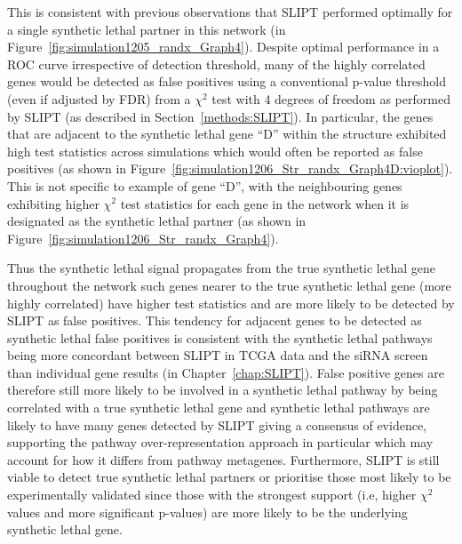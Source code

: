 This is consistent with previous observations that \gls{SLIPT} performed optimally for a single \gls{synthetic lethal} partner in this network (in Figure~\ref{fig:simulation1205_randx_Graph4}). Despite optimal performance in a \gls{ROC} curve irrespective of detection threshold, many of the highly correlated genes would be detected as false positives using a conventional p-value threshold (even if adjusted by \gls{FDR}) from a $\chi^2$ test with 4 degrees of freedom as performed by \gls{SLIPT} (as described in Section~\ref{methods:SLIPT}). In particular, the genes that are adjacent to the \gls{synthetic lethal} gene ``D'' within the  structure exhibited high test statistics across simulations which would often be reported as false positives (as shown in Figure~\ref{fig:simulation1206_Str_randx_Graph4D:vioplot}). This is not specific to example of gene ``D'', with the neighbouring genes exhibiting higher $\chi^2$ test statistics for each gene in the network when it is designated as the \gls{synthetic lethal} partner (as shown in Figure~\ref{fig:simulation1206_Str_randx_Graph4}).

Thus the \gls{synthetic lethal} signal propagates from the true \gls{synthetic lethal} gene throughout the network such genes nearer to the true \gls{synthetic lethal} gene (more highly correlated) have higher test statistics and are more likely to be detected by \gls{SLIPT} as false positives. This tendency for adjacent genes to be detected as \gls{synthetic lethal} false positives is consistent with the \gls{synthetic lethal} pathways being more concordant between \gls{SLIPT} in \gls{TCGA} data \citep{TCGA2012} and the \gls{siRNA} screen \citep{Telford2015} than individual gene results (in Chapter~\ref{chap:SLIPT}). False positive genes are therefore still more likely to be involved in a \gls{synthetic lethal} pathway by being correlated with a true \gls{synthetic lethal} gene and \gls{synthetic lethal} pathways are likely to have many genes detected by \gls{SLIPT} giving a consensus of evidence, supporting the pathway over-representation approach in particular which may account for how it differs from pathway \glspl{metagene}. Furthermore, \gls{SLIPT} is still viable to detect true \gls{synthetic lethal} partners or prioritise those most likely to be experimentally validated since those with the strongest support (i.e, higher $\chi^2$ values and more significant p-values) are more likely to be the underlying \gls{synthetic lethal} gene.

